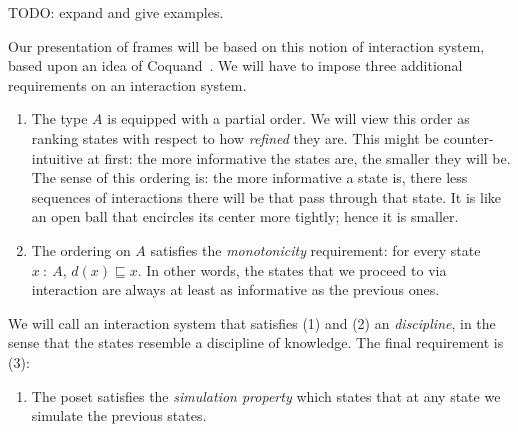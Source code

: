 TODO: expand and give examples.

Our presentation of frames will be based on this notion of interaction system, based upon
an idea of Coquand~\cite{coq-posets}. We will have to impose three additional requirements
on an interaction system.
\begin{enumerate}
  \item The type $A$ is equipped with a partial order. We will view this order as ranking
    states with respect to how \emph{refined} they are. This might be counter-intuitive at
    first: the more informative the states are, the smaller they will be. The sense of
    this ordering is: the more informative a state is, there less sequences of
    interactions there will be that pass through that state. It is like an open ball that
    encircles its center more tightly; hence it is smaller.
  \item The ordering on $A$ satisfies the \emph{monotonicity} requirement: for every state
    $x~:~A$, $d(x) \sqsubseteq x$. In other words, the states that we proceed to via interaction are
    always at least as informative as the previous ones.
\end{enumerate}
We will call an interaction system that satisfies (1) and (2) an \emph{discipline}, in the
sense that the states resemble a discipline of knowledge.
The final requirement is (3):
\begin{enumerate}
  \item The poset satisfies the \emph{simulation property} which states that at any state
    we simulate the previous states.
\end{enumerate}
